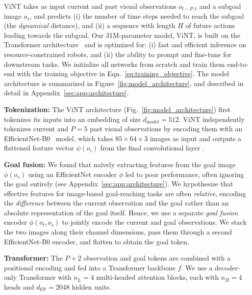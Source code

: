 \documentclass{article}
\newcommand{\ModelName}{ViNT\xspace}
\newcommand{\MyPara}[1]{\noindent\textbf{#1}}
\begin{document}
\ModelName takes as input current and past visual observations $o_{t-P:t}$ and a subgoal image $o_s$,
and predicts (i) the number of time steps needed to reach the subgoal (the \emph{dynamical} distance), and (ii) a sequence with length $H$ of future actions leading towards the subgoal.
Our 31M-parameter model, \ModelName, is built on the Transformer architecture~\cite{vaswani2017attention} and is optimized for: (i) fast and efficient inference on resource-constrained robots, and (ii) the ability to prompt and fine-tune for downstream tasks. We initialize all networks from scratch and train them end-to-end with the training objective in Eqn.~\ref{eq:training_objective}. The model architecture is summarized in Figure~\ref{fig:model_architecture}, and described in detail in Appendix~\ref{sec:app:architecture}.

\MyPara{Tokenization:} The \ModelName architecture (Fig.~\ref{fig:model_architecture}) first tokenizes its inputs into an embedding of size $d_\text{model} = 512$. \ModelName independently tokenizes current and $P=5$ past visual observations by encoding them with an EfficientNet-B0~\cite{tan2020efficientnet} model, which takes $85 \times 64 \times 3$ images as input and outputs a flattened feature vector $\psi(o_{i})$ from the final convolutional layer \cite{brohan2022rt1}.

\MyPara{Goal fusion:} 
We found that na\"{i}vely extracting features from the goal image $\phi(o_s)$ using an EfficientNet encoder $\phi$ led to poor performance, often ignoring the goal entirely (see Appendix~\ref{sec:app:architecture}). We hypothesize that effective features for image-based goal-reaching tasks are often \emph{relative}, encoding the \emph{difference} between the current observation and the goal rather than an absolute representation of the goal itself. Hence, we use a separate \emph{goal fusion} encoder $\phi(o_t, o_s)$ to jointly encode the current and goal observations. We stack the two images along their channel dimensions, pass them through a second EfficientNet-B0 encoder, and flatten to obtain the goal token.

\MyPara{Transformer:} The $P+2$ observation and goal tokens are combined with a positional encoding and fed into a Transformer backbone $f$. We use a decoder-only Transformer with $n_L=4$ multi-headed attention blocks, each with $n_H=4$ heads and $d_\text{FF}=2048$ hidden units.
\end{document}
